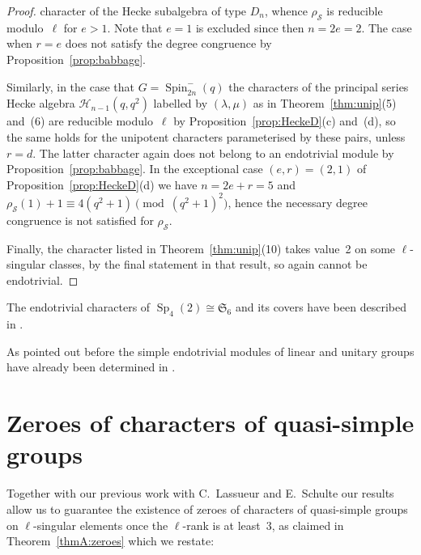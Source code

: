 \documentclass{ert-l}
\newcommand{\fS}{{\mathfrak{S}}}
\newcommand{\cH}{{\mathcal{H}}}
\newcommand{\cS}{{\mathcal{S}}}
\newcommand{\Sp}{{\operatorname{Sp}}}
\newcommand{\Spin}{{\operatorname{Spin}}}
\let\la=\lambda
\theoremstyle{definition}
\theoremstyle{remark}
\begin{document}
\begin{proof}
character of the Hecke subalgebra of type $D_n$, whence $\rho_\cS$ is reducible
modulo~$\ell$ for $e>1$. Note that $e=1$ is excluded since then $n=2e=2$. The
case when $r=e$ does not satisfy the degree congruence by
Proposition~\ref{prop:babbage}.
\par
Similarly, in the case that $G=\Spin_{2n}^-(q)$ the characters of the principal
series Hecke algebra $\cH_{n-1}(q,q^2)$ labelled by $(\la,\mu)$ as in
Theorem~\ref{thm:unip}(5) and~(6) are reducible modulo~$\ell$ by
Proposition~\ref{prop:HeckeD}(c) and~(d), so the same holds for the unipotent
characters parameterised by these pairs, unless $r=d$. The latter character
again does not belong to an endotrivial module by
Proposition~\ref{prop:babbage}. In the exceptional case $(e,r)=(2,1)$ of
Proposition~\ref{prop:HeckeD}(d) we have $n=2e+r=5$
and $\rho_\cS(1)+1\equiv 4(q^2+1)\pmod{(q^2+1)^2}$, hence the necessary degree
congruence is not satisfied for $\rho_\cS$.

Finally, the character listed in Theorem~\ref{thm:unip}(10) takes value~2 on
some $\ell$-singular classes, by the final statement in that result, so again
cannot be endotrivial.
\end{proof}

The endotrivial characters of $\Sp_4(2)\cong\fS_6$
and its covers have been described in \cite[Thm.~4.9]{LMS13}.

As pointed out before the simple endotrivial modules of linear and unitary
groups have already been determined in \cite[Thm.~3.10 and~4.5]{LM15}.


\section{Zeroes of characters of quasi-simple groups }   \label{sec:rank3}

Together with our previous work \cite{LM15,LMS13} with C.~Lassueur and
E.~Schulte our results allow us to guarantee the existence of zeroes of
characters of quasi-simple groups on $\ell$-singular elements once the
$\ell$-rank is at least~3, as claimed in Theorem~\ref{thmA:zeroes} which we
restate:
\end{document}
